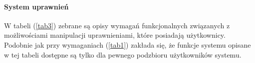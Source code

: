 \documentclass{article}
\begin{document}
\paragraph{System uprawnień\\}
W tabeli (\ref{tab3}) zebrane są opisy wymagań funkcjonalnych związanych z możliwościami manipulacji uprawnieniami, które posiadają użytkownicy.
Podobnie jak przy wymaganiach (\ref{tab1}) zakłada się, że funkcje systemu opisane w tej tabeli dostępne są tylko dla pewnego podzbioru 
użytkowników systemu.
\begin{table}[H]
\label{tab3}
\caption{Tabela z opisem wymogów funkcjonalnych.}
\end{table}
\end{document}
